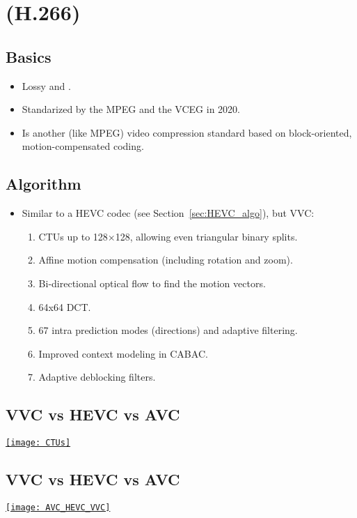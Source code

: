 \chapter{ (H.266)}

\section{Basics}
\begin{itemize}
\item Lossy and  \cite{wikipedia_VVC}.
\item Standarized by the \gls{MPEG} and the \gls{VCEG} in 2020.
\item Is another (like \gls{MPEG}) video compression standard based on
  block-oriented, motion-compensated coding.
\end{itemize}

\section{Algorithm}
\begin{itemize}
\item Similar to a \gls{HEVC} codec (see Section~\ref{sec:HEVC_algo}),
  but \gls{VVC}:
\begin{enumerate}
\item \glspl{CTU} up to 128×128, allowing even triangular binary splits.
\item Affine motion compensation (including rotation and zoom).
\item Bi-directional optical flow to find the motion vectors.
\item 64x64 \gls{DCT}.
\item 67 intra prediction modes (directions) and adaptive filtering.
\item Improved context modeling in \gls{CABAC}.
\item Adaptive deblocking filters.
\end{enumerate}
\end{itemize}

\section{VVC vs HEVC vs AVC}
\begin{center}
  \href{https://thebroadcastknowledge.com/2020/11/25/video-the-new-video-codec-landscape-vvc-evc-hevc-lc-evc-av1-and-more/}{\texttt{[image: CTUs]}}
\end{center}

\section*{VVC vs HEVC vs AVC}
\begin{center}
  \href{https://www.linkedin.com/pulse/video-coding-standards-comparison-sraas}{\texttt{[image: AVC\_HEVC\_VVC]}}
\end{center}

